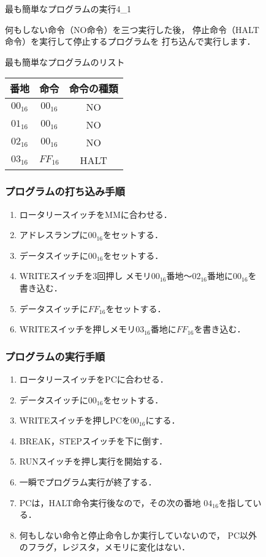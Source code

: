 \begin{figure}[tb]
  \begin{rei}{最も簡単なプログラムの実行}{4_1}

    何もしない命令（NO命令）を三つ実行した後，
    停止命令（HALT命令）を実行して停止するプログラムを
    打ち込んで実行します．

    {\ttfamily\small\begin{center}
      最も簡単なプログラムのリスト
      \begin{tabular}{|c|c|c|} \hline
        番地 & 命令 & 命令の種類\\
        \hline
        $00_{16}$ & $00_{16}$ & NO \\
        $01_{16}$ & $00_{16}$ & NO \\
        $02_{16}$ & $00_{16}$ & NO \\
        $03_{16}$ & $FF_{16}$ & HALT \\
        \hline
      \end{tabular}
    \end{center}}

    \subsubsection{プログラムの打ち込み手順}

    \begin{enumerate}
    \item ロータリースイッチをMMに合わせる．
    \item アドレスランプに$00_{16}$をセットする．
    \item データスイッチに$00_{16}$をセットする．
    \item WRITEスイッチを3回押し
      メモリ$00_{16}$番地〜$02_{16}$番地に$00_{16}$を書き込む．
    \item データスイッチに$FF_{16}$をセットする．
    \item WRITEスイッチを押しメモリ$03_{16}$番地に$FF_{16}$を書き込む．
    \end{enumerate}

    \subsubsection{プログラムの実行手順}

    \begin{enumerate}
    \item ロータリースイッチをPCに合わせる．
    \item データスイッチに$00_{16}$をセットする．
    \item WRITEスイッチを押しPCを$00_{16}$にする．
    \item BREAK，STEPスイッチを下に倒す．
    \item RUNスイッチを押し実行を開始する．
    \item 一瞬でプログラム実行が終了する．
    \item PCは，HALT命令実行後なので，その次の番地 $04_{16}$を指している．
    \item 何もしない命令と停止命令しか実行していないので，
      PC以外のフラグ，レジスタ，メモリに変化はない．
    \end{enumerate}


\end{rei}
\end{figure}
